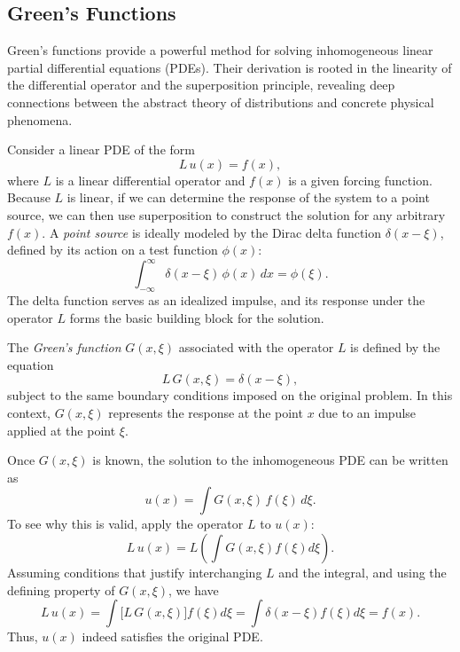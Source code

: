 \subsection*{Green's Functions} 

\noindent
Green's functions provide a powerful method for solving inhomogeneous linear partial differential equations (PDEs). Their derivation is rooted in the linearity of the differential operator and the superposition principle, revealing deep connections between the abstract theory of distributions and concrete physical phenomena.

\bigskip

\noindent
Consider a linear PDE of the form
\[
L\,u(x)=f(x),
\]
where \(L\) is a linear differential operator and \(f(x)\) is a given forcing function. Because \(L\) is linear, if we can determine the response of the system to a point source, we can then use superposition to construct the solution for any arbitrary \(f(x)\). A \emph{point source} is ideally modeled by the Dirac delta function \(\delta(x-\xi)\), defined by its action on a test function \(\phi(x)\):
\[
\int_{-\infty}^{\infty}\delta(x-\xi)\,\phi(x)\,dx = \phi(\xi).
\]
The delta function serves as an idealized impulse, and its response under the operator \(L\) forms the basic building block for the solution.

\bigskip

\noindent
The \emph{Green's function} \(G(x,\xi)\) associated with the operator \(L\) is defined by the equation
\[
L\,G(x,\xi)=\delta(x-\xi),
\]
subject to the same boundary conditions imposed on the original problem. In this context, \(G(x,\xi)\) represents the response at the point \(x\) due to an impulse applied at the point \(\xi\).

\bigskip

\noindent
Once \(G(x,\xi)\) is known, the solution to the inhomogeneous PDE can be written as
\[
u(x)=\int G(x,\xi)\,f(\xi)\,d\xi.
\]
To see why this is valid, apply the operator \(L\) to \(u(x)\):
\[
L\,u(x)=L\!\left(\int G(x,\xi)f(\xi)d\xi\right).
\]
Assuming conditions that justify interchanging \(L\) and the integral, and using the defining property of \(G(x,\xi)\), we have
\[
L\,u(x)=\int \bigl[L\,G(x,\xi)\bigr]f(\xi)d\xi = \int \delta(x-\xi)f(\xi)d\xi = f(x).
\]
Thus, \(u(x)\) indeed satisfies the original PDE.

\bigskip

